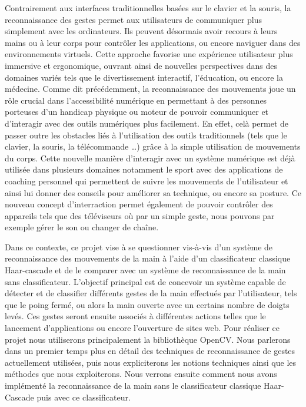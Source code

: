 \documentclass[11pt]{article}
\begin{document}
Contrairement aux interfaces traditionnelles basées sur le clavier et la souris, la reconnaissance des gestes permet aux utilisateurs de communiquer plus simplement avec les ordinateurs. Ils peuvent désormais avoir recours à leurs mains ou à leur corps pour contrôler les applications, ou encore naviguer dans des environnements virtuels. Cette approche favorise une expérience utilisateur plus immersive et ergonomique, ouvrant ainsi de nouvelles perspectives dans des domaines variés tels que le divertissement interactif, l'éducation, ou encore la médecine. Comme dit précédemment, la reconnaissance des mouvements joue un rôle crucial dans l’accessibilité numérique en permettant à des personnes porteuses d'un handicap physique  ou moteur de pouvoir communiquer et d'interagir avec des outils numériques plus facilement. En effet, celà permet de passer outre les obstacles liés à l’utilisation des outils traditionnels (tels que le clavier, la souris, la télécommande …) grâce à la simple utilisation de mouvements du corps. Cette nouvelle manière d'interagir avec un système numérique est déjà utilisée dans plusieurs domaines notamment le sport avec des applications de coaching personnel qui permettent de suivre les mouvements de l'utilisateur et ainsi lui donner des conseils pour améliorer sa technique, ou encore sa posture. Ce nouveau concept d'interraction permet également de pouvoir contrôler des appareils tels que des téléviseurs où par un simple geste, nous pouvons par exemple gérer le son ou changer de chaîne. \bigbreak

Dans ce contexte, ce projet vise à se questionner vis-à-vis d'un système de reconnaissance des mouvements de la main à l’aide d’un classificateur classique Haar-cascade et de le comparer avec un système de reconnaissance de la main sans classificateur.
L'objectif principal est de concevoir un système capable de détecter et de classifier différents gestes de la main effectués par l'utilisateur,
tels que le poing fermé, ou alors la main ouverte avec un certains nombre de doigts levés. Ces gestes seront ensuite associés à différentes 
actions telles que le lancement d'applications ou encore l'ouverture de sites web.
Pour réaliser ce projet nous utiliserons principalement la bibliothèque OpenCV. Nous parlerons dans un premier temps plus en détail des techniques de reconnaissance de gestes actuellement utilisées, puis nous expliciterons les notions techniques ainsi que les méthodes que nous exploiterons. Nous verrons ensuite comment nous avons implémenté la reconnaissance de la main sans le classificateur classique Haar-Cascade puis avec ce classificateur.
\end{document}
